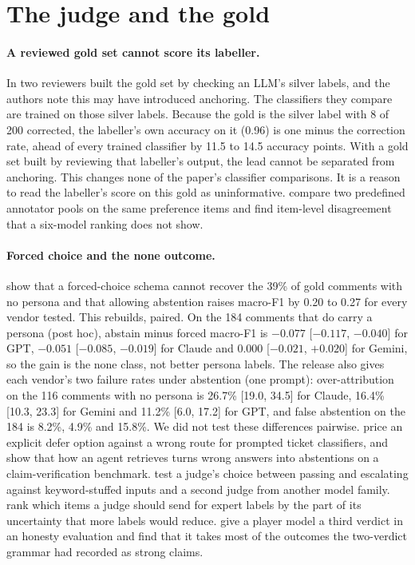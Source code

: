 \documentclass[11pt]{article}
\begin{document}
\section{The judge and the gold}
\paragraph{A reviewed gold set cannot score its labeller.} In \citep{r2610_25159} two reviewers built the gold set by checking an LLM's silver
labels, and the authors note this may have introduced anchoring. The classifiers they compare are trained on those silver labels. Because the
gold is the silver label with 8 of 200 corrected, the labeller's own accuracy on it (0.96) is one minus the correction rate, ahead of every
trained classifier by 11.5 to 14.5 accuracy points. With a gold set built by reviewing that labeller's output, the lead cannot be
separated from anchoring. This changes none of the paper's classifier comparisons. It is a reason to
read the labeller's score on this gold as uninformative. \citet{r2608_15980} compare two predefined annotator pools on the
same preference items and find item-level disagreement that a six-model ranking does not show.
\paragraph{Forced choice and the none outcome.} \citet{r2610_15732} show that a forced-choice schema cannot recover the 39\% of gold comments
with no persona and that allowing abstention raises macro-F1 by 0.20 to 0.27 for every vendor tested. This rebuilds, paired. On the 184
comments that do carry a persona (post hoc), abstain minus forced macro-F1 is $-0.077$ [$-0.117$, $-0.040$] for GPT, $-0.051$ [$-0.085$,
$-0.019$] for Claude and $0.000$ [$-0.021$, $+0.020$] for Gemini, so the gain is the none class, not better persona labels. The release also
gives each vendor's two failure rates under abstention (one prompt): over-attribution on the 116 comments with no persona is 26.7\% [19.0,
34.5] for Claude, 16.4\% [10.3, 23.3] for Gemini and 11.2\% [6.0, 17.2] for GPT, and false abstention on the 184 is 8.2\%, 4.9\% and 15.8\%.
We did not test these differences pairwise. \citet{r2610_31657} price an explicit defer option against a wrong route for prompted
ticket classifiers, and \citet{r2610_29812} show that how an agent retrieves turns wrong answers into abstentions on a claim-verification
benchmark. \citet{r2608_14329} test a judge's choice between passing and escalating against keyword-stuffed inputs and a second judge
from another model family. \citet{r2609_06444} rank which items a judge should send for expert labels by the part of its uncertainty that
more labels would reduce. \citet{r2607_14399} give a player model a third verdict in an honesty evaluation and find that it takes most of
the outcomes the two-verdict grammar had recorded as strong claims.
\end{document}
